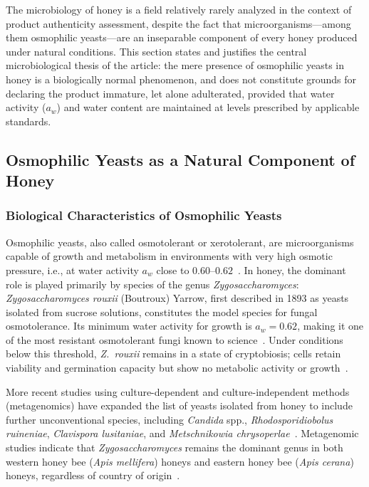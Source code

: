\documentclass[foods,review,accept,pdftex,moreauthors]{Definitions/mdpi}
\begin{document}
{The microbiology of honey is a field relatively rarely analyzed
in the context of product authenticity assessment, despite the fact
that microorganisms---among them osmophilic yeasts---are an
inseparable component of every honey produced under natural
conditions. This section states and justifies the central
microbiological thesis of the article: the mere presence of
osmophilic yeasts in honey is a biologically normal phenomenon,
and does not constitute grounds for declaring the product immature,
let alone adulterated, provided that water activity ($a_w$) and
water content are maintained at levels prescribed by applicable
standards.


\subsection{Osmophilic Yeasts as a Natural Component of Honey}


\subsubsection{Biological Characteristics of Osmophilic Yeasts}

Osmophilic yeasts, also called osmotolerant or xerotolerant, are
microorganisms capable of growth and metabolism in environments
with very high osmotic pressure, i.e., at water activity $a_w$
close to $0.60$--$0.62$~\cite{ruegg1981,waaw2006}. In honey,
the dominant role is played primarily by species of the genus
\textit{Zygosaccharomyces}:
\textit{Zygosaccharomyces rouxii} (Boutroux) Yarrow, first described
in 1893 as yeasts isolated from sucrose solutions, constitutes the
model species for fungal osmotolerance. Its minimum water activity
for growth is $a_w = 0.62$, making it one of the most resistant
osmotolerant fungi known to
science~\cite{waaw2006}. Under conditions below this threshold,
\textit{Z.~rouxii} remains in a state of cryptobiosis; cells
retain viability and germination capacity but show no metabolic
activity or growth~\cite{waaw2006,ruegg1981}.

More recent studies using culture-dependent and culture-independent
methods (metagenomics) have expanded the list of yeasts isolated
from honey to include further unconventional species, including
\textit{Candida} spp., \textit{Rhodosporidiobolus ruineniae},
\textit{Clavispora lusitaniae}, and \textit{Metschnikowia
chrysoperlae}~\cite{rodriguezmachado2024}.
Metagenomic studies indicate that \textit{Zygosaccharomyces}
remains the dominant genus in both western honey bee
(\textit{Apis mellifera}) honeys and eastern honey bee
(\textit{Apis cerana}) honeys, regardless of country of
origin~\cite{yeastbiodiversity2025}.

}
\end{document}
